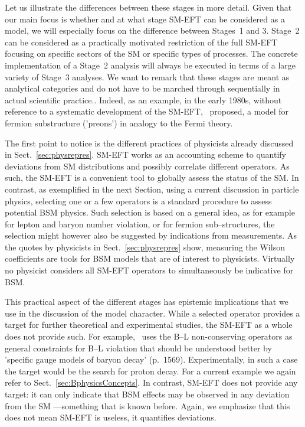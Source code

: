 Let us illustrate the differences between these stages in more detail. 
Given that our main focus is whether and at what stage SM-EFT can be considered as a model, we will especially focus on the difference between Stages~1 and 3. 
Stage~2 can be considered as a practically motivated restriction of the full SM-EFT focusing on specific sectors of the SM or specific types of processes. 
The concrete implementation of a Stage~2 analysis will always be executed in terms of a large variety of Stage~3 analyses. 
We want to remark that these stages are meant as analytical categories and do not have to be marched through sequentially in actual scientific practice..
Indeed, as an example, in the early 1980s, without reference to
a systematic development of the SM-EFT,~\citep{Eichten:1983hw} proposed,
a model for fermion substructure ('preons') in analogy to the Fermi theory.

The first point to notice is the different practices of physicists already discussed in
Sect.~\ref{sec:physrepres}.
SM-EFT works as an accounting scheme to quantify deviations
from SM distributions and possibly correlate different operators.
As such, the SM-EFT is a convenient tool to globally assess the status of the SM.
In contrast, as exemplified in the next Section, using a current discussion in particle physics,
selecting one or a few operators is a standard procedure to assess potential BSM physics.
Such selection is based on a general idea, as for example~\cite{Weinberg:1979sa} for lepton
and baryon number violation, or \cite{Eichten:1983hw} for fermion sub--structures, the
selection might however also be suggested by indications from measurements. 
As the quotes by physicists in Sect.~\ref{sec:physrepres} show, measuring the Wilson coefficients
are tools for BSM models that are of interest to physicists.
Virtually no physicist considers all SM-EFT operators to simultaneously be indicative for BSM. 

This practical aspect of the different stages has epistemic implications that we use in the discussion of
the model character.
While a selected operator provides a target for further theoretical and experimental studies,
the SM-EFT as a whole does not provide such.
For example,~\cite{Weinberg:1979sa} uses the B--L non-conserving operators as general
constraints for B--L violation that should be understood better by 'specific gauge models of
baryon decay' (p.~1569).
Experimentally, in such a case the target would be the search for proton decay.
For a current example we again refer to Sect.~\ref{sec:BphysicsConcepts}.
In contrast, SM-EFT does not provide any target: it can only indicate that BSM effects may be observed in any deviation from the SM
---something that is known before.
Again, we emphasize that this does not mean SM-EFT is useless, it quantifies deviations.

